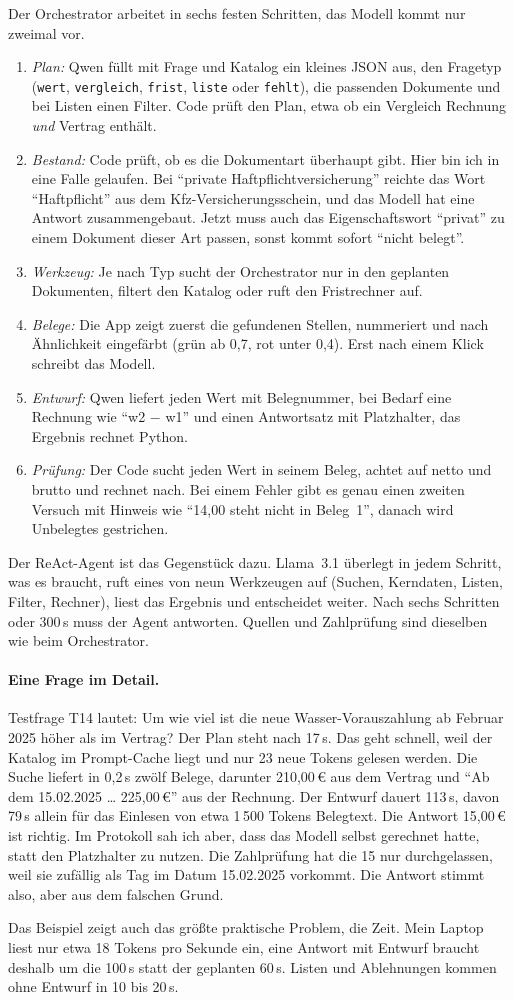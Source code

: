 Der Orchestrator arbeitet in sechs festen Schritten, das Modell kommt nur zweimal vor.
\begin{enumerate}[nosep, leftmargin=*]
    \item \emph{Plan:} Qwen füllt mit Frage und Katalog ein kleines JSON aus, den Fragetyp (\texttt{wert}, \texttt{vergleich}, \texttt{frist}, \texttt{liste} oder \texttt{fehlt}), die passenden Dokumente und bei Listen einen Filter. Code prüft den Plan, etwa ob ein Vergleich Rechnung \emph{und} Vertrag enthält.
    \item \emph{Bestand:} Code prüft, ob es die Dokumentart überhaupt gibt. Hier bin ich in eine Falle gelaufen. Bei \enquote{private Haftpflichtversicherung} reichte das Wort \enquote{Haftpflicht} aus dem Kfz-Versicherungsschein, und das Modell hat eine Antwort zusammengebaut. Jetzt muss auch das Eigenschaftswort \enquote{privat} zu einem Dokument dieser Art passen, sonst kommt sofort \enquote{nicht belegt}.
    \item \emph{Werkzeug:} Je nach Typ sucht der Orchestrator nur in den geplanten Dokumenten, filtert den Katalog oder ruft den Fristrechner auf.
    \item \emph{Belege:} Die App zeigt zuerst die gefundenen Stellen, nummeriert und nach Ähnlichkeit eingefärbt (grün ab 0,7, rot unter 0,4). Erst nach einem Klick schreibt das Modell.
    \item \emph{Entwurf:} Qwen liefert jeden Wert mit Belegnummer, bei Bedarf eine Rechnung wie \enquote{w2 $-$ w1} und einen Antwortsatz mit Platzhalter, das Ergebnis rechnet Python.
    \item \emph{Prüfung:} Der Code sucht jeden Wert in seinem Beleg, achtet auf netto und brutto und rechnet nach. Bei einem Fehler gibt es genau einen zweiten Versuch mit Hinweis wie \enquote{14,00 steht nicht in Beleg~1}, danach wird Unbelegtes gestrichen.
\end{enumerate}
Der ReAct-Agent ist das Gegenstück dazu. Llama~3.1 überlegt in jedem Schritt, was es braucht, ruft eines von neun Werkzeugen auf (Suchen, Kerndaten, Listen, Filter, Rechner), liest das Ergebnis und entscheidet weiter. Nach sechs Schritten oder 300\,s muss der Agent antworten. Quellen und Zahlprüfung sind dieselben wie beim Orchestrator.

\paragraph{Eine Frage im Detail.} Testfrage T14 lautet: Um wie viel ist die neue Wasser-Vorauszahlung ab Februar 2025 höher als im Vertrag? Der Plan steht nach 17\,s. Das geht schnell, weil der Katalog im Prompt-Cache liegt und nur 23 neue Tokens gelesen werden. Die Suche liefert in 0,2\,s zwölf Belege, darunter 210,00\,€ aus dem Vertrag und \enquote{Ab dem 15.02.2025 \dots{} 225,00\,€} aus der Rechnung. Der Entwurf dauert 113\,s, davon 79\,s allein für das Einlesen von etwa 1\,500 Tokens Belegtext. Die Antwort 15,00\,€ ist richtig. Im Protokoll sah ich aber, dass das Modell selbst gerechnet hatte, statt den Platzhalter zu nutzen. Die Zahlprüfung hat die 15 nur durchgelassen, weil sie zufällig als Tag im Datum 15.02.2025 vorkommt. Die Antwort stimmt also, aber aus dem falschen Grund.

Das Beispiel zeigt auch das größte praktische Problem, die Zeit. Mein Laptop liest nur etwa 18 Tokens pro Sekunde ein, eine Antwort mit Entwurf braucht deshalb um die 100\,s statt der geplanten 60\,s. Listen und Ablehnungen kommen ohne Entwurf in 10 bis 20\,s.
